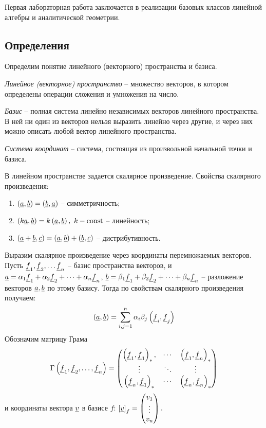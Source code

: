 Первая лабораторная работа заключается в реализации базовых классов линейной алгебры и аналитической геометрии.


\subsection{Определения}

	Определим понятие линейного (векторного) пространства и базиса. 

	\textit{Линейное (векторное) пространство} -- множество векторов, в котором определены операции сложения и умножения на число.

	\textit{Базис} -- полная система линейно независимых векторов линейного пространства. В ней ни один из векторов нельзя выразить линейно через другие, и через них можно описать любой вектор линейного пространства.
	
	\textit{Система координат} -- система, состоящая из произвольной начальной точки и базиса. 

	В линейном пространстве задается скалярное произведение. Свойства скалярного произведения:
	\begin{enumerate}
		\item \( \left( \underline{a}, \underline{b} \right) = \left( \underline{b}, \underline{a} \right) \) -- симметричность;
		\item \( \left( k \underline{a}, \underline{b} \right) = k\left( \underline{a}, \underline{b} \right), ~ k - \mathrm{const} \) -- линейность;
		\item \( \left( \underline{a} + \underline{b}, \underline{c} \right) = \left( \underline{a}, \underline{b} \right) + \left( \underline{b}, \underline{c} \right) \) -- дистрибутивность.
	\end{enumerate} 

	Выразим скалярное произведение через координаты перемножаемых векторов. Пусть \( \underline{f}_1, \underline{f}_2, \dots \underline{f}_n \) -- базис пространства векторов, и \( \underline{a} = \alpha_1 \underline{f}_1 + \alpha_2 \underline{f}_2 + \dots + \alpha_n \underline{f}_n \), \( \underline{b} = \beta_1 \underline{f}_1 + \beta_2 \underline{f}_2 + \dots + \beta_n \underline{f}_n \) -- разложение векторов $\underline{a}, \underline{b}$ по этому базису. Тогда по свойствам скалярного произведения получаем:
	\[ \left( \underline{a}, \underline{b} \right) = \sum_{i, j = 1}^{n} \alpha_i \beta_j \left( \underline{f}_i, \underline{f}_j \right) \]
	Обозначим матрицу Грама
	\[ 
		\Gamma \left( \underline{f}_1, \underline{f}_2, \dots, \underline{f}_n \right) = 
		\begin{pmatrix} 
			\left( \underline{f}_1, \underline{f}_1 \right)_*, & \cdots & \left( \underline{f}_1, \underline{f}_n \right)_* \\ 
			\vdots & \ddots & \vdots \\ 
			\left( \underline{f}_n, \underline{f}_1 \right)_* & \cdots & \left( \underline{f}_n, \underline{f}_n \right)_*
		\end{pmatrix}
	\]
	и координаты вектора $\underline{v}$ в базисе $f$:
	\( \left[ \underline{v} \right]_f = \begin{pmatrix} v_1 \\ \vdots \\ v_n \end{pmatrix}. \)
	
